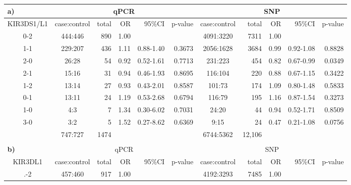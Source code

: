 


\begin{table}[h]\footnotesize
\begin{tabularx}{\textwidth}{ccrrrr|crrrr}
  \multicolumn{1}{l}{\bf{a)}} & \multicolumn{5}{c}{qPCR} & \multicolumn{5}{c}{SNP} \\
  \hline
    KIR3DS1/L1 & case:control & total & OR & 95\%CI & p-value & case:control & total  & OR & 95\%CI & p-value \\
  \hline
    0-2 & 444:446 &  890 & 1.00 &  &  & 4091:3220 &  7311  & 1.00 &  &  \\
    1-1 & 229:207 &  436 & 1.11 & 0.88-1.40 & 0.3673 & 2056:1628 &  3684  & 0.99 & 0.92-1.08 & 0.8828 \\
    2-0 & 26:28 &   54 & 0.92 & 0.52-1.61 & 0.7713 & 231:223 &   454  & 0.82 & 0.67-0.99 & 0.0349 \\
    2-1 & 15:16 &   31 & 0.94 & 0.46-1.93 & 0.8695 & 116:104 &   220  & 0.88 & 0.67-1.15 & 0.3422 \\
    1-2 & 13:14 &   27 & 0.93 & 0.43-2.01 & 0.8587 & 101:73 &   174  & 1.09 & 0.80-1.48 & 0.5833 \\
    0-1 & 13:11 &   24 & 1.19 & 0.53-2.68 & 0.6794 & 116:79 &   195  & 1.16 & 0.87-1.54 & 0.3273 \\
    1-0 & 4:3 &    7 & 1.34 & 0.30-6.02 & 0.7031 & 24:20 &    44  & 0.94 & 0.52-1.71 & 0.8509 \\
    3-0 & 3:2 &    5 & 1.52 & 0.27-8.62 & 0.6369 & 9:15 &    24  & 0.47 & 0.21-1.08 & 0.0756 \\
  \hline
    & 747:727 & 1474 &  &  &  & 6744:5362 & 12,106  &  & &  \\
  \\
  \multicolumn{1}{l}{\bf{b)}} & \multicolumn{5}{c}{qPCR} & \multicolumn{5}{c}{SNP} \\
  \hline
    KIR3DL1 & case:control & total & OR & 95\%CI & p-value & case:control & total  & OR & 95\%CI & p-value \\
  \hline
    .-2 & 457:460 &  917 & 1.00 &  &  & 4192:3293 &  7485  & 1.00 &  &  \\

\end{tabularx}
\end{table}
